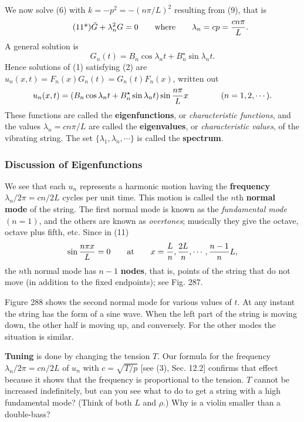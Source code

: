 \documentclass[12pt, leqno, oneside]{amsart}
\begin{document}
We now solve (6) with $k=-p^2=-(n\pi/L)^2$ resulting from (9), that is
\begin{equation}
  \tag{11*}
    \ddot{G}+\lambda_n^2G=0 \qquad \text{where} \qquad \lambda_n=cp= \\
        \frac{cn\pi}{L}.
\end{equation}
A general solution is
\begin{equation}
  \nonumber
    G_n(t)=B_n\cos{\lambda_n t} + B_n^\star\sin{\lambda_n t}.
\end{equation}
Hence solutions of (1) satisfying (2) are 
$u_n(x,t)=F_n(x)G_n(t)=G_n(t)F_n(x)$, written out
\begin{equation}
    u_n(x,t)=(B_n\cos{\lambda_n t} + B_n^\star\sin{\lambda_n t}) \\
        \sin{\frac{n\pi}{L} x} \qquad \qquad (n=1,2,\dotsb).
\end{equation}
These functions are called the \textbf{eigenfunctions}, or 
\emph{characteristic functions}, and the values $\lambda_n=cn\pi/L$ are called 
the \textbf{eigenvalues}, or \emph{characteristic values}, of the vibrating 
string. The set $\{\lambda_1,\lambda_n,\dotsb\}$ is called the 
\textbf{spectrum}.

\subsubsection{Discussion of Eigenfunctions}

We see that each $u_n$ represents a harmonic motion having the 
\textbf{frequency} $\lambda_n/2\pi=cn/2L$ cycles per unit time. This motion is 
called the $n$th \textbf{normal mode} of the string. The first normal mode is 
known as the \emph{fundamental mode} $(n=1)$, and the others are known as 
\emph{overtones}; musically they give the octave, octave plus fifth, etc. 
Since in (11)
\begin{equation}
  \nonumber
    \sin{\frac{n\pi x}{L}}=0 \qquad \text{at} \qquad x=\frac{L}{n}, \\
        \frac{2L}{n},\dotsb,\frac{n-1}{n}L,
\end{equation}
the $n$th normal mode has $n-1$ \textbf{nodes}, that is, points of the string 
that do not move (in addition to the fixed endpoints); see Fig. 287.

Figure 288 shows the second normal mode for various values of $t$. At any 
instant the string has the form of a sine wave. When the left part of the 
string is moving down, the other half is moving up, and conversely. For the 
other modes the situation is similar.

\textbf{Tuning} is done by changing the tension $T$. Our formula for the 
frequency $\lambda_n/2\pi=cn/2L$ of $u_n$  with $c=\sqrt{T/p}$ [see (3), Sec. 
12.2] confirms that effect because it shows that the frequency is proportional 
to the tension. $T$ cannot be increased indefinitely, but can you see what to 
do to get a string with a high fundamental mode? (Think of both $L$ and 
$\rho$.) Why is a violin smaller than a double-bass?
\end{document}
